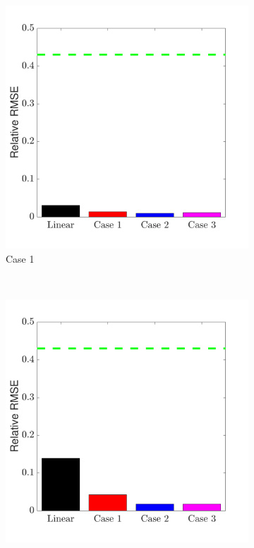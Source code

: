 \documentclass{jov}
\begin{document}
\begin{figure}
\centering
\begin{subfigure}{0.3 \textwidth}
	\includegraphics[width=\textwidth]{../Figures/Figure13/Figure13_a.pdf}
	\caption{Case 1}
	\label{fig:case1Bar}
    \end{subfigure}
    ~ 
    \begin{subfigure}{0.3 \textwidth}   
	\includegraphics[width=\textwidth]{../Figures/Figure13/Figure13_b.pdf}

\end{subfigure}
\end{figure}
\end{document}

